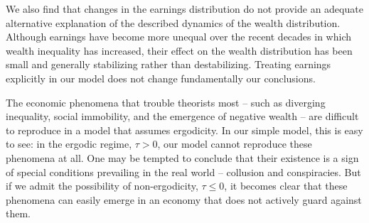 We also find that changes in the earnings distribution do not provide an adequate alternative explanation of the described dynamics of the wealth distribution. Although earnings have become more unequal over the recent decades in which wealth inequality has increased, their effect on the wealth distribution has been small and generally stabilizing rather than destabilizing. Treating earnings explicitly in our model does not change fundamentally our conclusions.

The economic phenomena that trouble theorists most -- such as diverging inequality, social immobility, and the emergence of negative wealth -- are difficult to reproduce in a model that assumes ergodicity. In our simple model, this is easy to see: in the ergodic regime, $\tau>0$, our model cannot reproduce these phenomena at all. One may be tempted to conclude that their existence is a sign of special conditions prevailing in the real world -- collusion and conspiracies. But if we admit the possibility of non-ergodicity, $\tau\leq0$, it becomes clear that these phenomena can easily emerge in an economy that does not actively guard against them.

